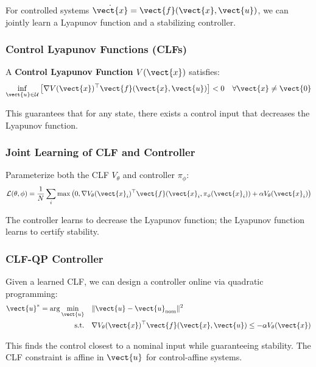 For controlled systems $\dot{\vect{x}} = \vect{f}(\vect{x}, \vect{u})$, we can jointly learn a Lyapunov function and a stabilizing controller.

\subsubsection{Control Lyapunov Functions (CLFs)}

A \textbf{Control Lyapunov Function} $V(\vect{x})$ satisfies:
\begin{equation}
\inf_{\vect{u} \in \mathcal{U}} \left[ \nabla V(\vect{x})^\top \vect{f}(\vect{x}, \vect{u}) \right] < 0 \quad \forall \vect{x} \neq \vect{0}
\label{eq:clf_condition}
\end{equation}

This guarantees that for any state, there exists a control input that decreases the Lyapunov function.

\subsubsection{Joint Learning of CLF and Controller}

Parameterize both the CLF $V_\theta$ and controller $\pi_\phi$:
\begin{equation}
\mathcal{L}(\theta, \phi) = \frac{1}{N}\sum_i \max\left(0, \nabla V_\theta(\vect{x}_i)^\top \vect{f}(\vect{x}_i, \pi_\phi(\vect{x}_i)) + \alpha V_\theta(\vect{x}_i)\right)
\label{eq:joint_clf_loss}
\end{equation}

The controller learns to decrease the Lyapunov function; the Lyapunov function learns to certify stability.

\subsubsection{CLF-QP Controller}

Given a learned CLF, we can design a controller online via quadratic programming:
\begin{align}
\vect{u}^* = \arg\min_{\vect{u}} \quad & \|\vect{u} - \vect{u}_{\text{nom}}\|^2 \\
\text{s.t.} \quad & \nabla V_\theta(\vect{x})^\top \vect{f}(\vect{x}, \vect{u}) \leq -\alpha V_\theta(\vect{x})
\label{eq:clf_qp}
\end{align}

This finds the control closest to a nominal input while guaranteeing stability. The CLF constraint is affine in $\vect{u}$ for control-affine systems.

